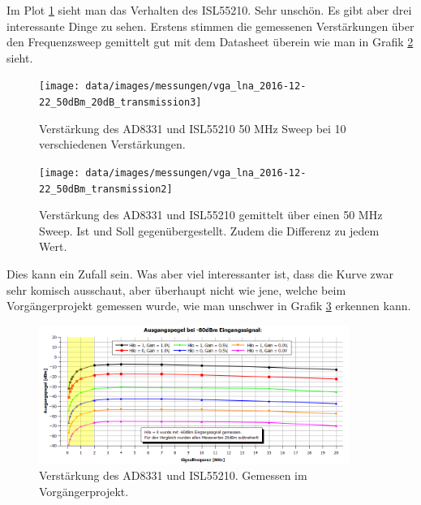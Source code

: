 Im Plot \ref{fig:T_broken_ISL55210} sieht man das Verhalten des ISL55210. Sehr unschön. Es gibt aber drei interessante Dinge zu sehen.
Erstens stimmen die gemessenen Verstärkungen über den Frequenzsweep gemittelt gut mit dem Datasheet überein wie man in Grafik \ref{fig:T_broken_mean_ISL55210} sieht.

\begin{figure}[H]
\begin{center}
    \texttt{[image: data/images/messungen/vga\_lna\_2016-12-22\_50dBm\_20dB\_transmission3]}
    \caption{Verstärkung des AD8331 und ISL55210 50 MHz Sweep bei 10 verschiedenen Verstärkungen.}
    \label{fig:T_broken_ISL55210}
\end{center}
\end{figure}

\begin{figure}[H]
\begin{center}
    \texttt{[image: data/images/messungen/vga\_lna\_2016-12-22\_50dBm\_transmission2]}
    \caption{Verstärkung des AD8331 und ISL55210 gemittelt über einen 50 MHz Sweep. Ist und Soll gegenübergestellt. Zudem die Differenz zu jedem Wert.}
    \label{fig:T_broken_mean_ISL55210}
\end{center}
\end{figure}

Dies kann ein Zufall sein. Was aber viel interessanter ist, dass die Kurve zwar sehr komisch ausschaut, aber überhaupt nicht wie jene, welche beim Vorgängerprojekt gemessen wurde, wie man unschwer in Grafik \ref{fig:ganzes_system_vorganger} erkennen kann.

\begin{figure}[H]
\begin{center}
    \includegraphics[width=0.9\textwidth]{data/images/ganzes_system_vorganger}
    \caption{Verstärkung des AD8331 und ISL55210. Gemessen im Vorgängerprojekt.}
    \label{fig:ganzes_system_vorganger}
\end{center}
\end{figure}

